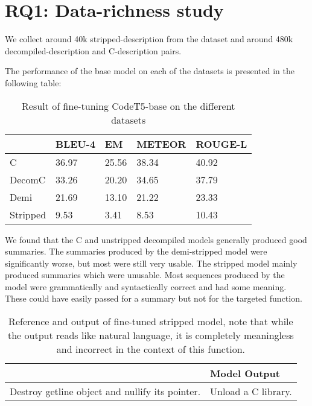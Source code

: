 \section{RQ1: Data-richness study}
We collect around 40k stripped-description from the dataset and around 480k decompiled-description and C-description pairs. 

The performance of the base model on each of the datasets is presented in the following table:

\begin{table}[!h]
\centering
\begin{tabular}{lllll} 
\hline
\rowcolor[rgb]{0.761,0.761,0.761} \multicolumn{1}{|l}{\textbf{Duplicated}} & BLEU-4 & EM    & METEOR & \multicolumn{1}{l|}{ROUGE-L}  \\ 
\hline
C                                                                          & 36.97  & 25.56 & 38.34  &  40.92                            \\
DecomC                                                                     & 33.26  & 20.20 & 34.65  & 37.79                             \\
Demi                                                                       & 21.69  & 13.10 & 21.22  &  23.33                             \\
Stripped                                                                   & 9.53   & 3.41  & 8.53  &  10.43                          
\end{tabular}
\caption{Result of fine-tuning CodeT5-base on the different datasets}
\label{tab:duplicated}
\end{table}

We found that the C and unstripped decompiled models generally produced good summaries. The summaries produced by the demi-stripped model were significantly worse, but most were still very usable. The stripped model mainly produced summaries which were unusable. Most sequences produced by the model were grammatically and syntactically correct and had some meaning. These could have easily passed for a summary but not for the targeted function.

\begin{table}[!h]
\centering
\begin{tabular}{ll}
\hline
\rowcolor[HTML]{9B9B9B} 
\multicolumn{1}{|l}{\cellcolor[HTML]{9B9B9B}Reference} & \multicolumn{1}{l|}{\cellcolor[HTML]{9B9B9B}Model Output}    \\ \hline
Destroy getline object and nullify its pointer.               & Unload a C library.
\end{tabular}
\caption{Reference and output of fine-tuned stripped model, note that while the output reads like natural language, it is completely meaningless and incorrect in the context of this function.}
\label{tab:syntax}
\end{table}


